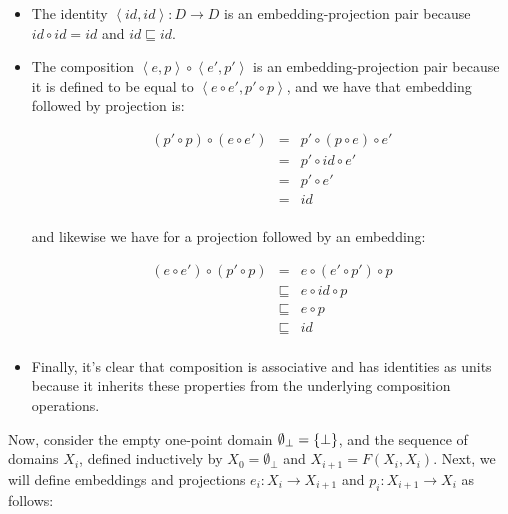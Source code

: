 \begin{itemize}
\item The identity $\left<id, id\right> : D \to D$ is an 
embedding-projection pair because $id \circ id = id$ and 
$id \sqsubseteq id$. 

\item The composition $\left<e, p\right> \circ \left<e',
p'\right>$ is an embedding-projection pair because it 
is defined to be equal to $\left<e \circ e', p' \circ p\right>$, 
and we have that embedding followed by projection is:

\begin{displaymath}
  \begin{array}{lcl}
    (p' \circ p) \circ (e \circ e') 
       & = & p' \circ (p \circ e) \circ e' \\ 
       & = & p' \circ id \circ e' \\ 
       & = & p' \circ e' \\
       & = & id \\                 
  \end{array}
\end{displaymath}

and likewise we have for a projection followed by an embedding:

\begin{displaymath}
  \begin{array}{lcll}
    (e \circ e')  \circ (p' \circ p) 
       & = & e \circ (e' \circ p') \circ p \\
       & \sqsubseteq & e \circ id \circ p \\ 
       & \sqsubseteq & e \circ p \\
       & \sqsubseteq & id \\                 
  \end{array}
\end{displaymath}

\item Finally, it's clear that composition is associative and has
  identities as units because it inherits these properties from the
  underlying composition operations.
\end{itemize}


Now, consider the empty one-point domain $\emptyset_\bot =
\{{\bot}\}$, and the sequence of domains $X_i$, defined inductively
by $X_0 = \emptyset_\bot$ and $X_{i+1} = F(X_i, X_i)$. Next, 
we will define embeddings and projections $e_i : X_i \to X_{i+1}$ 
and $p_i : X_{i+1} \to X_i$ as follows: 

